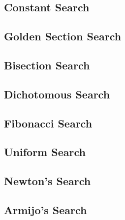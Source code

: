 
\subsection*{Constant Search}


\subsection*{Golden Section Search}


\subsection*{Bisection Search}


\subsection*{Dichotomous Search}


\subsection*{Fibonacci Search}


\subsection*{Uniform Search}


\subsection*{Newton's Search}


\subsection*{Armijo's Search}

